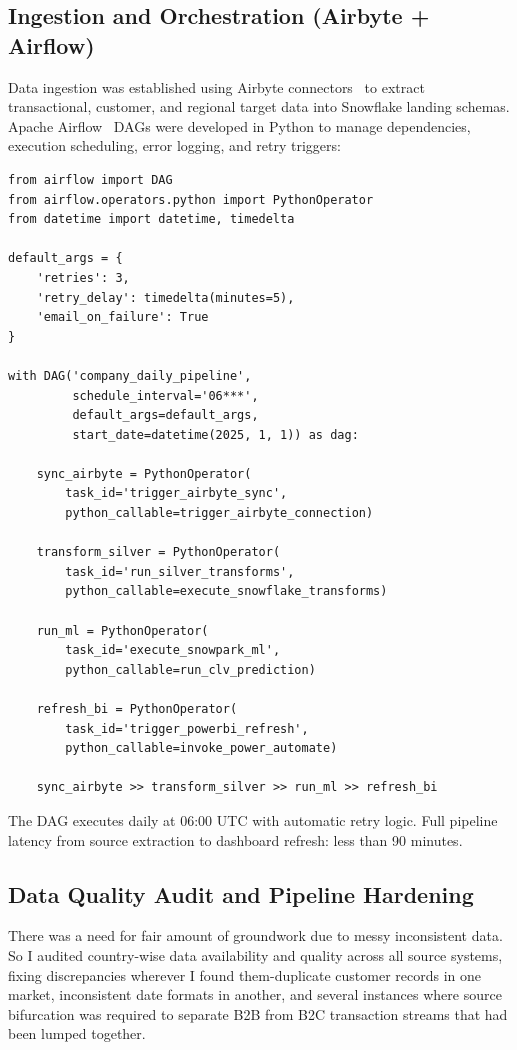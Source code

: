 \documentclass[11pt,a4paper]{article}
\begin{document}
\subsection{Ingestion and Orchestration (Airbyte + Airflow)}

Data ingestion was established using Airbyte connectors~\cite{airbyte2024docs} to extract transactional, customer, and regional target data into Snowflake landing schemas. Apache Airflow~\cite{apache2024airflow} DAGs were developed in Python to manage dependencies, execution scheduling, error logging, and retry triggers:

\begin{lstlisting}[caption={Airflow DAG structure for daily data pipeline orchestration.}]
from airflow import DAG
from airflow.operators.python import PythonOperator
from datetime import datetime, timedelta

default_args = {
    'retries': 3,
    'retry_delay': timedelta(minutes=5),
    'email_on_failure': True
}

with DAG('company_daily_pipeline',
         schedule_interval='06***',
         default_args=default_args,
         start_date=datetime(2025, 1, 1)) as dag:

    sync_airbyte = PythonOperator(
        task_id='trigger_airbyte_sync',
        python_callable=trigger_airbyte_connection)

    transform_silver = PythonOperator(
        task_id='run_silver_transforms',
        python_callable=execute_snowflake_transforms)

    run_ml = PythonOperator(
        task_id='execute_snowpark_ml',
        python_callable=run_clv_prediction)

    refresh_bi = PythonOperator(
        task_id='trigger_powerbi_refresh',
        python_callable=invoke_power_automate)

    sync_airbyte >> transform_silver >> run_ml >> refresh_bi
\end{lstlisting}

The DAG executes daily at 06:00 UTC with automatic retry logic. Full pipeline latency from source extraction to dashboard refresh: less than 90 minutes.

\subsection{Data Quality Audit and Pipeline Hardening}

There was a need for fair amount of groundwork due to messy inconsistent data. So I audited country-wise data availability and quality across all source systems, fixing discrepancies wherever I found them-duplicate customer records in one market, inconsistent date formats in another, and several instances where source bifurcation was required to separate B2B from B2C transaction streams that had been lumped together.
\end{document}
